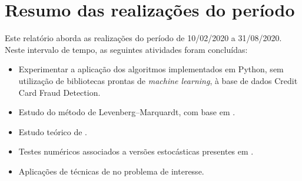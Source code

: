 \documentclass[a4paper,12pt]{article}
\begin{document}
\section*{Resumo das realizações do período}
Este relatório aborda as realizações do período de 10/02/2020 a 31/08/2020. Neste intervalo de tempo, as seguintes atividades foram concluídas:

\begin{comment}
A primeira tarefa a ser realiazada no próximo período é o estudo dos artigos \cite{fraudeItalia2} e \cite{fraudeItalia1}, que estava previsto para acontecer no primeiro semestre de atividades, porém foi atrasado pelo deslocamento da data de inicio do projeto em 1 mês.\\

Após isso, seguimos com o planejamento inicial, que consiste em:
\end{comment}
\begin{itemize}

\item Experimentar a aplicação dos algoritmos implementados em Python, sem utilização de bibliotecas prontas de \textit{machine learning}, à base de dados Credit Card Fraud Detection.

\item Estudo do método de Levenberg–Marquardt, com base em \cite{TCCKleber}.
\item Estudo teórico de \cite{bmLS}. 
\item Testes numéricos associados a versões estocásticas presentes em \cite{bmLS}.
\item Aplicações de técnicas de \cite{bmLS} no problema de interesse.
\end{itemize}

\newpage
\end{document}
